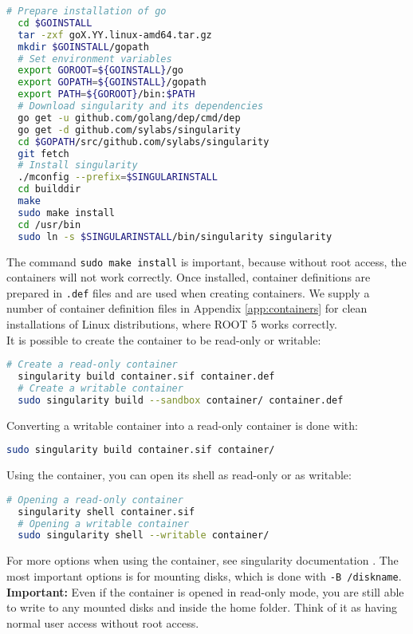 \documentclass[12pt,a4paper]{report}
\begin{document}
\begin{lstlisting}[language=bash]
  # Prepare installation of go
  cd $GOINSTALL
  tar -zxf goX.YY.linux-amd64.tar.gz
  mkdir $GOINSTALL/gopath
  # Set environment variables
  export GOROOT=${GOINSTALL}/go
  export GOPATH=${GOINSTALL}/gopath
  export PATH=${GOROOT}/bin:$PATH
  # Download singularity and its dependencies
  go get -u github.com/golang/dep/cmd/dep
  go get -d github.com/sylabs/singularity
  cd $GOPATH/src/github.com/sylabs/singularity
  git fetch
  # Install singularity
  ./mconfig --prefix=$SINGULARINSTALL
  cd builddir
  make
  sudo make install
  cd /usr/bin
  sudo ln -s $SINGULARINSTALL/bin/singularity singularity
\end{lstlisting}
The command \texttt{sudo make install} is important, because without root access, the containers will not work correctly. Once installed, container definitions are prepared in \texttt{.def} files and are used when creating containers. We supply a number of container definition files in Appendix \ref{app:containers} for clean installations of Linux distributions, where ROOT 5 works correctly.\\
It is possible to create the container to be read-only or writable:
\begin{lstlisting}[language=bash]
  # Create a read-only container
  singularity build container.sif container.def
  # Create a writable container
  sudo singularity build --sandbox container/ container.def
\end{lstlisting}
Converting a writable container into a read-only container is done with:
\begin{lstlisting}[language=bash]
  sudo singularity build container.sif container/
\end{lstlisting}
Using the container, you can open its shell as read-only or as writable:
\begin{lstlisting}[language=bash]
  # Opening a read-only container
  singularity shell container.sif
  # Opening a writable container
  sudo singularity shell --writable container/
\end{lstlisting}
For more options when using the container, see singularity documentation \cite{singularitydoc}. The most important options is for mounting disks, which is done with \linebreak\texttt{-B /diskname}.\\
\textbf{Important:} Even if the container is opened in read-only mode, you are still able to write to any mounted disks and inside the home folder. Think of it as having normal user access without root access.
\end{document}

